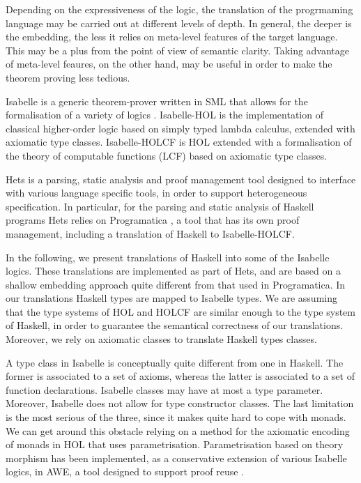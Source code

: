 \documentclass[a4paper,12pt]{article}
\begin{document}
Depending on the expressiveness of the logic, the translation of the
progrmaming language may be carried out at different levels of depth.
In general, the deeper is the embedding, the less it relies on
meta-level features of the target language. This may be a plus from
the point of view of semantic clarity. Taking advantage of meta-level
feaures, on the other hand, may be useful in order to make the theorem
proving less tedious.

Isabelle is a generic theorem-prover written in SML that allows for
the formalisation of a variety of logics \cite{Paulson94isa}.
Isabelle-HOL is the implementation of classical higher-order logic
based on simply typed lambda calculus, extended with axiomatic type
classes. Isabelle-HOLCF \cite{holcf} is HOL extended with a
formalisation of the theory of computable functions (LCF) based on
axiomatic type classes.

Hets \cite{Hets} is a parsing, static analysis and proof management
tool designed to interface with various language specific tools, in
order to support heterogeneous specification. In particular, for the
parsing and static analysis of Haskell programs Hets relies on
Programatica \cite{PTeam}, a tool that has its own proof management,
including a translation of Haskell to Isabelle-HOLCF.

In the following, we present translations of Haskell into some of the
Isabelle logics. These translations are implemented as part of Hets,
and are based on a shallow embedding approach quite different from
that used in Programatica. In our translations Haskell types are
mapped to Isabelle types. We are assuming that the type systems of HOL
and HOLCF are similar enough to the type system of Haskell, in order
to guarantee the semantical correctness of our translations. Moreover,
we rely on axiomatic classes to translate Haskell types classes.

A type class in Isabelle is conceptually quite different from one in
Haskell. The former is associated to a set of axioms, whereas the
latter is associated to a set of function declarations. Isabelle
classes may have at most a type parameter.  Moreover, Isabelle does
not allow for type constructor classes. The last limitation is the
most serious of the three, since it makes quite hard to cope with
monads.  We can get around this obstacle relying on a method for the
axiomatic encoding of monads in HOL that uses parametrisation.
Parametrisation based on theory morphism has been implemented, as a
conservative extension of various Isabelle logics, in AWE, a tool
designed to support proof reuse \cite{AWE}.
\end{document}
